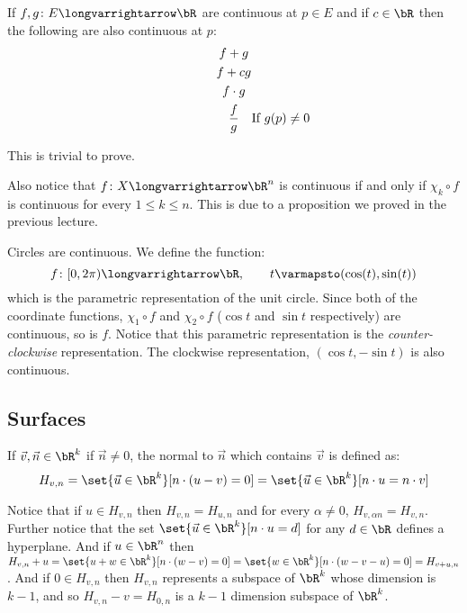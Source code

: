 \documentclass[10pt]{article}
\begin{document}
\begin{prop*}

    If $f,g\colon E\longvarrightarrow\bR$ are continuous at $p\in E$ and if $c\in\bR$ then the following are also continuous at $p$:
    \begin{gather*}
        f + g \\
        f + cg \\
        f\cdot g \\
        \frac fg \rlap{\quad If $g(p)\neq0$}
    \end{gather*}

\end{prop*}

This is trivial to prove.

Also notice that $f\colon X\longvarrightarrow\bR^n$ is continuous if and only if $\chi_k\circ f$ is continuous for every $1\leq k\leq n$.
This is due to a proposition we proved in the previous lecture.

\begin{exam}

    Circles are continuous.
    We define the function:
    \[ f\colon[0,2\pi)\longvarrightarrow\bR,\qquad t\varmapsto(\cos(t), \sin(t)) \]
    which is the parametric representation of the unit circle.
    Since both of the coordinate functions, $\chi_1\circ f$ and $\chi_2\circ f$ ($\cos t$ and $\sin t$ respectively) are continuous, so is $f$.
    Notice that this parametric representation is the \emph{counter-clockwise} representation.
    The clockwise representation, $(\cos t, -\sin t)$ is also continuous.

\end{exam}

\newpage
\subsection{Surfaces}

\begin{defn*}

    If $\vec v,\vec n\in\bR^k$ if $\vec n\neq0$, the  normal to $\vec n$ which contains $\vec v$ is defined as:
    \[ H_{v,n} = \set{\vec u\in\bR^k}[n\cdot(u-v)=0] = \set{\vec u\in\bR^k}[n\cdot u = n\cdot v] \]

\end{defn*}

Notice that if $u\in H_{v,n}$ then $H_{v,n}=H_{u,n}$ and for every $\alpha\neq0$, $H_{v,\alpha n}=H_{v,n}$.
Further notice that the set $\set{\vec u\in\bR^k}[n\cdot u=d]$ for any $d\in\bR$ defines a hyperplane.
And if $u\in\bR^n$ then $H_{v,n}+u=\set{u+w\in\bR^k}[n\cdot(w-v)=0] = \set{w\in\bR^k}[n\cdot(w-v-u)=0] = H_{v+u,n}$.
And if $0\in H_{v,n}$ then $H_{v,n}$ represents a subspace of $\bR^k$ whose dimension is $k-1$, and so $H_{v,n}-v=H_{0,n}$ is a $k-1$ dimension subspace of $\bR^k$.
\end{document}
